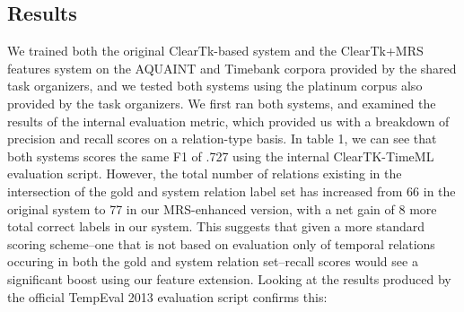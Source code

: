 \documentclass[11pt]{article}
\begin{document}
 \subsection {Results}
  We trained both the original ClearTk-based system and the ClearTk+MRS features system on the AQUAINT and Timebank corpora provided by the shared task organizers, and we tested both systems using the platinum corpus also provided by the task organizers. We first ran both systems, and examined the results of the internal evaluation metric, which provided us with a breakdown of precision and recall scores on a relation-type basis. In table 1, we can see that both systems scores the same F1 of .727 using the internal ClearTK-TimeML evaluation script. However, the total number of relations existing in the intersection of the gold and system relation label set has increased from 66 in the original system to 77 in our MRS-enhanced version, with a net gain of 8 more total correct labels in our system. This suggests that given a more standard scoring scheme--one that is not based on evaluation only of temporal relations occuring in both the gold and system relation set--recall scores would see a significant boost using our feature extension. Looking at the results produced by the official TempEval 2013 evaluation script confirms this:   
\begin{table*}[t]
\centering
\caption{Results using ClearTK-TimeML system's internal evaluation script and the platinum test data set}
\label{my-label}
\end{table*}
\end{document}
